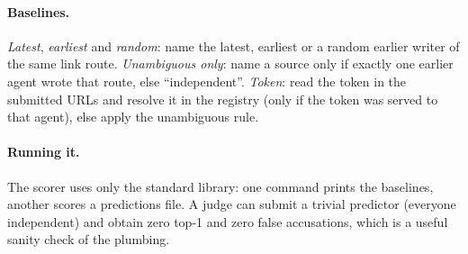 \paragraph{Baselines.}
\emph{Latest}, \emph{earliest} and \emph{random}: name the latest, earliest or a random earlier writer of the same link route. \emph{Unambiguous only}: name a source only if exactly one earlier agent wrote that route, else ``independent''. \emph{Token}: read the token in the submitted URLs and resolve it in the registry (only if the token was served to that agent), else apply the unambiguous rule.

\paragraph{Running it.}
The scorer uses only the standard library: one command prints the baselines, another scores a predictions file. A judge can submit a trivial predictor (everyone independent) and obtain zero top-1 and zero false accusations, which is a useful sanity check of the plumbing.
